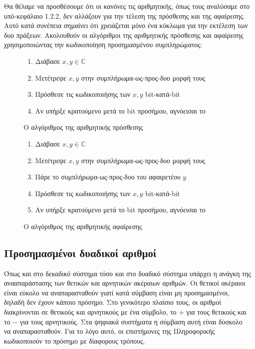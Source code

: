 Θα θέλαμε να προσθέσουμε ότι οι κανόνες τις αριθμητικής, όπως τους αναλύσαμε στο υπό-κεφάλαιο 1.2.2, δεν αλλάζουν για την τέλεση της πρόσθεσης
και της αφαίρεσης. Αυτό κατά συνέπεια σημαίνει ότι χρειάζεται μόνο ένα κύκλωμα για την εκτέλεση των δυο πράξεων. Ακολουθούν οι αλγόριθμοι της
αριθμητικής πρόσθεσης και αφαίρεσης χρησιμοποιώντας την κωδικοποίηση προσημασμένου συμπληρώματος:

\begin{figure}[ht]
    \begin{enumerate}
        \item Διάβασε $x, y \in \mathbb{C}$
        \item Μετέτρεψε $x, y$ στην συμπλήρωμα-ως-προς-δυο μορφή τους
        \item Πρόσθεσε τις κωδικοποιήσης των $x, y$ bit-κατά-bit
        \item Αν υπήρξε κρατούμενο μετά το bit προσήμου, αγνόεισαι το
    \end{enumerate}
    \caption{Ο αλγόριθμος της αριθμητικής πρόσθεσης}
\end{figure}

\begin{figure}[ht]
    \begin{enumerate}
        \item Διάβασε $x, y \in \mathbb{C}$
        \item Μετέτρεψε $x, y$ στην συμπλήρωμα-ως-προς-δυο μορφή τους
        \item Πάρε το συμπλήρωμα-ως-προς-δυο του αφαιρετέου $y$
        \item Πρόσθεσε τις κωδικοποιήσης των $x, y$ bit-κατά-bit
        \item Αν υπήρξε κρατούμενο μετά το bit προσήμου, αγνόεισαι το
    \end{enumerate}
    \caption{Ο αλγόριθμος της αριθμητικής αφαίρεσης}
\end{figure}

\subsection{Προσημασμένοι δυαδικοί αριθμοί}

Όπως και στο δεκαδικό σύστημα τόσο και στο δυαδικό σύστημα υπάρχει η ανάγκη της ανααπαράστασης των θετικών και αρνητικών ακέραιων αριθμών.
Οι θετικοί ακέραιοι είναι εύκολο να αναπαρασταθούν γιατί κατά σύμβαση είναι μη προσημασμένοι, δηλαδή δεν έχουν κάποιο πρόσημο. Στο γενικότερο
πλαίσιο τους, οι αριθμοί διακρίνονται σε θετικούς και αρνητικούς με ένα σύμβολο, το $+$ για τους θετικούς και το $-$ για τους αρνητικούς. Στα
ψηφιακά συστήματα η σύμβαση αυτή είναι δύσκολο να αναπαρασταθούν. Για το λόγο αυτό, οι επιστήμονες της Πληροφορικής κωδικοποιούν το πρόσημο με δίαφορους
τρόπους.

